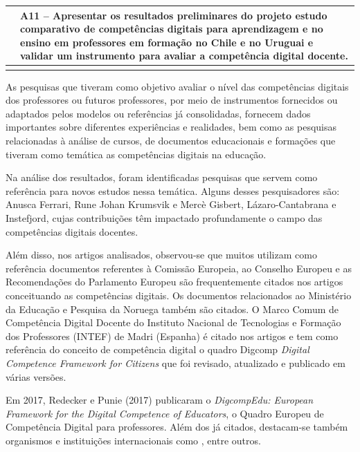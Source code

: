 \documentclass[portuguese]{textolivre}
\begin{document}
\begin{small}
\begin{longtable}{
    >{\raggedright\arraybackslash}p{}
    >{\raggedright\arraybackslash}p{}
    }
									     & A11 – Apresentar os resultados preliminares do projeto estudo comparativo de competências digitais para aprendizagem e no ensino em professores em formação no Chile e no Uruguai e validar um instrumento para avaliar a competência digital docente. \\
\bottomrule
\source{\textcite{silva2022}.}
\end{longtable}
\end{small}

As pesquisas que tiveram como objetivo avaliar o nível das competências
digitais dos professores ou futuros professores, por meio de
instrumentos fornecidos ou adaptados pelos modelos ou referências já
consolidadas, fornecem dados importantes sobre diferentes experiências e
realidades, bem como as pesquisas relacionadas à análise de cursos, de
documentos educacionais e formações que tiveram como temática as
competências digitais na educação.

Na análise dos resultados, foram identificadas pesquisas que servem como
referência para novos estudos nessa temática. Alguns desses
pesquisadores são: Anusca Ferrari, Rune Johan Krumsvik e Mercè Gisbert,
Lázaro-Cantabrana e Instefjord, cujas contribuições têm impactado
profundamente o campo das competências digitais docentes.

Além disso, nos artigos analisados, observou-se que muitos utilizam como
referência documentos referentes à Comissão Europeia, ao Conselho
Europeu e as Recomendações do Parlamento Europeu são frequentemente
citados nos artigos conceituando as competências digitais. Os documentos
relacionados ao Ministério da Educação e Pesquisa da Noruega também são
citados. O Marco Comum de Competência Digital Docente do Instituto
Nacional de Tecnologias e Formação dos Professores (INTEF) de Madri
(Espanha) é citado nos artigos e tem como referência do conceito de
competência digital o quadro Digcomp \emph{Digital Competence Framework
for Citizens} \cite{ferrari2012} que foi revisado, atualizado e
publicado em várias versões.

Em 2017, \textcite{redecker2017}Redecker e Punie (2017) publicaram o \emph{DigcompEdu: European
Framework for the Digital Competence of Educators}, o Quadro Europeu de
Competência Digital para professores. Além dos já citados, destacam-se
também organismos e instituições internacionais como \textcite{unesco2008,ocde2011,mineduc2008,iste2008}, entre outros.
\end{document}
